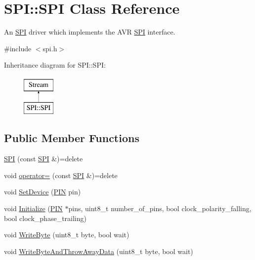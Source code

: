 \hypertarget{class_s_p_i_1_1_s_p_i}{}\section{S\+PI\+:\+:S\+PI Class Reference}
\label{class_s_p_i_1_1_s_p_i}


An \hyperlink{class_s_p_i_1_1_s_p_i}{S\+PI} driver which implements the A\+VR \hyperlink{class_s_p_i_1_1_s_p_i}{S\+PI} interface.  




{\ttfamily \#include $<$spi.\+h$>$}

Inheritance diagram for S\+PI\+:\+:S\+PI\+:\begin{figure}[H]
\begin{center}
\leavevmode
\includegraphics[height=2.000000cm]{class_s_p_i_1_1_s_p_i}
\end{center}
\end{figure}
\subsection*{Public Member Functions}
\begin{DoxyCompactItemize}
\item 
\hyperlink{class_s_p_i_1_1_s_p_i_a3892e59b84bed60d98ce7ee8909d1744}{S\+PI} (const \hyperlink{class_s_p_i_1_1_s_p_i}{S\+PI} \&)=delete
\item 
void \hyperlink{class_s_p_i_1_1_s_p_i_a1f6f97ecc8aec31173c61179ee5c6aae}{operator=} (const \hyperlink{class_s_p_i_1_1_s_p_i}{S\+PI} \&)=delete
\item 
void \hyperlink{class_s_p_i_1_1_s_p_i_a4c48f641a89d5b72428979f39c9fa96f}{Set\+Device} (\hyperlink{struct_s_p_i_1_1_p_i_n}{P\+IN} pin)
\item 
void \hyperlink{class_s_p_i_1_1_s_p_i_a8d047c13b1bc93dd9b31c91d7d5081e9}{Initialize} (\hyperlink{struct_s_p_i_1_1_p_i_n}{P\+IN} $\ast$pins, uint8\+\_\+t number\+\_\+of\+\_\+pins, bool clock\+\_\+polarity\+\_\+falling, bool clock\+\_\+phase\+\_\+trailing)
\item 
void \hyperlink{class_s_p_i_1_1_s_p_i_a29a9a80b0e7a32f25b7571205344a84d}{Write\+Byte} (uint8\+\_\+t byte, bool wait)
\item 
void \hyperlink{class_s_p_i_1_1_s_p_i_a2cd0f0612198d4e6a793ce794c016b9d}{Write\+Byte\+And\+Throw\+Away\+Data} (uint8\+\_\+t byte, bool wait)
\end{DoxyCompactItemize}
